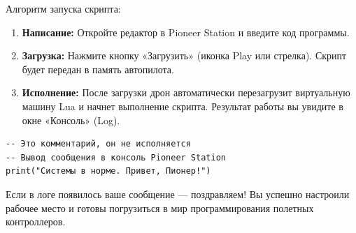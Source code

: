 Алгоритм запуска скрипта:
\begin{enumerate}
    \item \textbf{Написание:} Откройте редактор в Pioneer Station и введите код программы.
    \item \textbf{Загрузка:} Нажмите кнопку «Загрузить» (иконка Play или стрелка). Скрипт будет передан в память автопилота.
    \item \textbf{Исполнение:} После загрузки дрон автоматически перезагрузит виртуальную машину Lua и начнет выполнение скрипта. Результат работы вы увидите в окне «Консоль» (Log).
\end{enumerate}

\begin{codebox}
\begin{verbatim}
-- Это комментарий, он не исполняется
-- Вывод сообщения в консоль Pioneer Station
print("Системы в норме. Привет, Пионер!")
\end{verbatim}
\end{codebox}

Если в логе появилось ваше сообщение — поздравляем! Вы успешно настроили рабочее место и готовы погрузиться в мир программирования полетных контроллеров.
